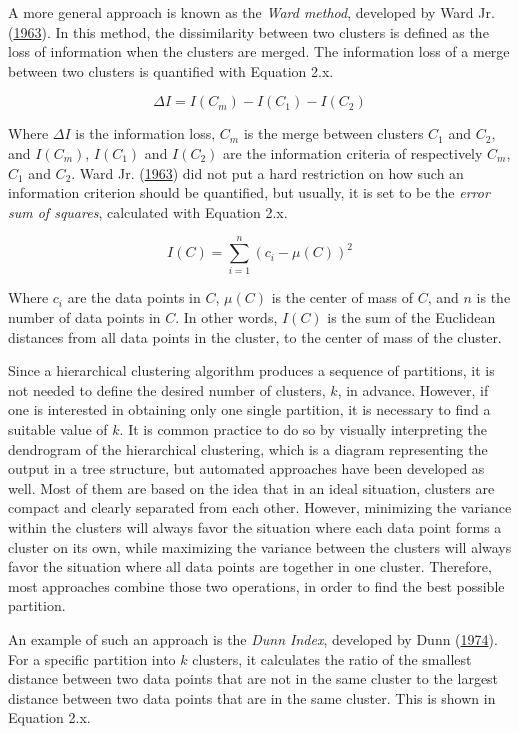 \documentclass[12pt,oneside]{reedthesis}
\begin{document}
A more general approach is known as the \emph{Ward method}, developed by
Ward Jr. (\protect\hyperlink{ref-ward1963}{1963}). In this method, the
dissimilarity between two clusters is defined as the loss of information
when the clusters are merged. The information loss of a merge between
two clusters is quantified with Equation 2.x.

\[ \Delta I = I(C_{m}) - I(C_{1}) - I(C_{2}) \]

Where \(\Delta I\) is the information loss, \(C_{m}\) is the merge
between clusters \(C_{1}\) and \(C_{2}\), and \(I(C_{m})\), \(I(C_{1})\)
and \(I(C_{2})\) are the information criteria of respectively \(C_{m}\),
\(C_{1}\) and \(C_{2}\). Ward Jr.
(\protect\hyperlink{ref-ward1963}{1963}) did not put a hard restriction
on how such an information criterion should be quantified, but usually,
it is set to be the \emph{error sum of squares}, calculated with
Equation 2.x.

\[ I(C) = \sum_{i = 1}^{n} (c_{i} - \mu(C))^{2} \]

Where \(c_{i}\) are the data points in \(C\), \(\mu(C)\) is the center
of mass of \(C\), and \(n\) is the number of data points in \(C\). In
other words, \(I(C)\) is the sum of the Euclidean distances from all
data points in the cluster, to the center of mass of the cluster.

Since a hierarchical clustering algorithm produces a sequence of
partitions, it is not needed to define the desired number of clusters,
\(k\), in advance. However, if one is interested in obtaining only one
single partition, it is necessary to find a suitable value of \(k\). It
is common practice to do so by visually interpreting the dendrogram of
the hierarchical clustering, which is a diagram representing the output
in a tree structure, but automated approaches have been developed as
well. Most of them are based on the idea that in an ideal situation,
clusters are compact and clearly separated from each other. However,
minimizing the variance within the clusters will always favor the
situation where each data point forms a cluster on its own, while
maximizing the variance between the clusters will always favor the
situation where all data points are together in one cluster. Therefore,
most approaches combine those two operations, in order to find the best
possible partition.

An example of such an approach is the \emph{Dunn Index}, developed by
Dunn (\protect\hyperlink{ref-dunn1974}{1974}). For a specific partition
into \(k\) clusters, it calculates the ratio of the smallest distance
between two data points that are not in the same cluster to the largest
distance between two data points that are in the same cluster. This is
shown in Equation 2.x.
\end{document}
